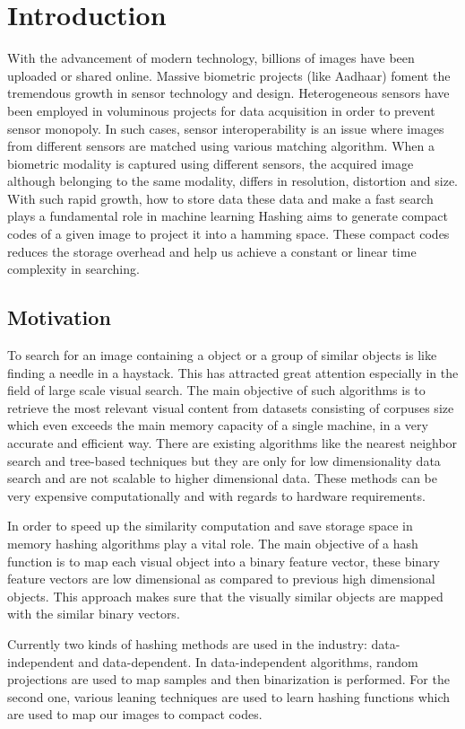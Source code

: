 \chapter{Introduction}
\label{chapter1}
With the advancement of modern technology, billions of images have been uploaded or shared online.
Massive biometric projects (like Aadhaar) foment the
tremendous growth in sensor technology and design. Heterogeneous sensors have been employed in voluminous projects for data acquisition in order to prevent sensor monopoly. In such cases, sensor interoperability is an issue where images from different sensors are matched using various matching algorithm. When a biometric modality is captured using different sensors, the acquired image although belonging to the same modality, differs in resolution, distortion and size.
With such rapid growth, how to store data these data and make a fast search plays a fundamental role in machine learning
Hashing aims to generate compact codes of a given image to project it into a hamming space. These compact codes reduces the storage overhead and help us achieve a constant or linear time complexity in searching.
\section{Motivation}
To search for an image containing a object or a group of similar objects is like finding a needle in a haystack. This has attracted great attention especially in the field of large scale visual search. The main objective of such algorithms is to retrieve the most relevant visual content from 
datasets consisting of corpuses size which even exceeds the main memory capacity of a single machine, in a very accurate and efficient way.
There are existing algorithms like the nearest neighbor search and tree-based techniques but they are only for low dimensionality data search and are 
not scalable to higher dimensional data. These methods can be very expensive computationally and with regards to hardware requirements.

In order to speed up the similarity computation and save storage space in memory hashing algorithms play a vital role. The main objective of a 
hash function is to map each visual object into a binary feature vector, these binary feature vectors are low dimensional as compared to previous 
high dimensional objects. This approach makes sure that the visually similar objects are mapped with the similar binary vectors.

Currently two kinds of hashing methods are used in the industry: data-independent and data-dependent. In data-independent algorithms, random projections are used to map samples and then binarization is performed. For the second one, various leaning  techniques are used to learn hashing functions which are used to map our images to compact codes.

